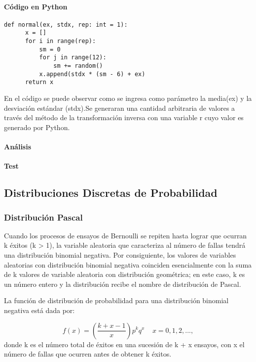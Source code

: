 \documentclass{article}
\begin{document}
  \paragraph{Código en Python}
  \begin{lstlisting}[style = Python]
    def normal(ex, stdx, rep: int = 1):
      x = []
      for i in range(rep):
          sm = 0
          for j in range(12):
              sm += random()
          x.append(stdx * (sm - 6) + ex)
      return x
  \end{lstlisting}
  En el código se puede observar como se ingresa como parámetro la media(ex) y la desviación estándar (stdx).Se
  generaran una cantidad arbitraria de valores a través del método de la transformación inversa con una variable r cuyo
  valor es generado por Python.

  \paragraph{Análisis}

  \paragraph{Test}

  \subsection{Distribuciones Discretas de Probabilidad}
  \subsubsection{Distribución Pascal}
  Cuando los procesos de ensayos de Bernoulli se repiten hasta lograr que ocurran k éxitos (k > 1), la variable aleatoria que caracteriza al número de fallas tendrá una distribución binomial negativa.
  Por consiguiente, los valores de variables aleatorias con distribución binomial negativa coinciden esencialmente con la suma de k valores de variable aleatoria con distribución geométrica; en este caso, k es un
  número entero y la distribución recibe el nombre de distribución de Pascal.

  La función de distribución de probabilidad para una distribución binomial negativa está dada por:

  \begin{equation}
    f(x) = (\frac{k+x-1}{x})p^{k}q^{x} \ \text{   } \ x = 0,1,2,...,
  \end{equation}
  donde k es el número total de éxitos en una sucesión de k + x ensayos, con x el número de fallas que ocurren antes de obtener k éxitos.
\end{document}
